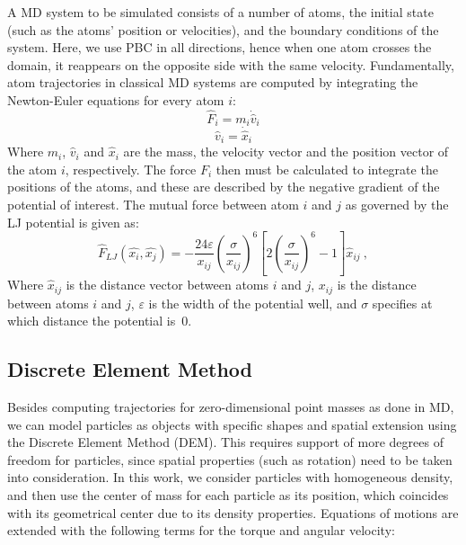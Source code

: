 \documentclass[Afour,sageh,times]{sagej}
\newcommand{\RMchange}[1]{{\color{blue} #1}}
\begin{document}
A \ac{MD} system to be simulated \RMchange{consists} of a number of atoms, the initial state (such as the atoms' position or velocities), and the boundary conditions of the system.
Here, we use \ac{PBC} in all directions, hence when one atom crosses the domain, it reappears on the opposite side with the same velocity.
Fundamentally, atom trajectories in classical \ac{MD} systems are computed by integrating \RMchange{the} Newton-Euler equations for every atom $i$:
\begin{equation}
    \hat F_i = m_i \dot{\hat v}_i \label{eq:newton_force}
\end{equation}
\begin{equation}
    \hat v_i = \dot{\hat x}_i \label{eq:newton_velocity}
\end{equation}
Where $m_i$, $\hat v_i$ and $\hat x_i$ are the mass, the velocity vector and the position vector of the atom $i$, respectively.
The force $F_i$ then must be calculated to integrate the positions of the atoms, and these are described by the negative gradient of the potential of interest.
The mutual force between atom $i$ and $j$ as governed by the \ac{LJ} potential
is given as:
\begin{equation}
    \hat{F}_{LJ}(\hat{x_i}, \hat{x_j}) = -\frac{24\varepsilon}{x_{ij}} \left( \frac{\sigma}{x_{ij}} \right)^{6} \left[ 2\left(\frac{\sigma}{x_{ij}}\right)^{6} - 1\right] \hat{x}_{ij}~,
    \label{eq:lennard_jones}
\end{equation}
Where $\hat{x}_{ij}$ is the distance vector between atoms $i$ and $j$, $x_{ij}$ is the distance between atoms $i$ and $j$, $\varepsilon$ is the width of the potential well, and $\sigma$ specifies at which distance the potential is~$0$.

\subsection{Discrete Element Method}
\label{sec:dem}

Besides computing trajectories for zero-dimensional point masses as done in MD, we can model particles as objects with specific shapes and spatial extension using the Discrete Element Method (DEM).
This requires support of more degrees of freedom for particles, since spatial properties (such as rotation) need to be taken into consideration.
In this work, we consider particles with homogeneous density, and then use the center of mass for each particle as its position, which coincides with its geometrical center due to its density properties.
Equations of motions are extended with the following terms for the torque and angular velocity:
\end{document}

